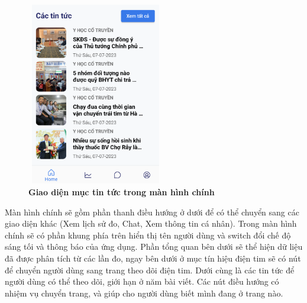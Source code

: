 \begin{figure}[H]
  \centering
  \includegraphics[width=6cm,height=8cm]{Images/mobile_app/demo/preview_news.png}
  \caption[Giao diện mục tin tức trong màn hình chính]{\bfseries \fontsize{12pt}{0pt}\selectfont Giao diện mục tin tức trong màn hình chính}
  \label{demo_preview_news} %
\end{figure}

Màn hình chính sẽ gồm phần thanh điều hướng ở dưới để có thể chuyển sang các giao diện khác (Xem lịch sử đo, Chat, Xem thông tin cá nhân).
Trong màn hình chính sẽ có phần khung phía trên hiển thị tên người dùng và switch đổi chế độ sáng tối và thông báo của ứng dụng.
Phần tổng quan bên dưới sẽ thể hiện dữ liệu đã được phân tích từ các lần đo, ngay bên dưới ở mục tín hiệu điện tim sẽ có nút để chuyển người dùng
sang trang theo dõi điện tim. Dưới cùng là các tin tức để người dùng có thể theo dõi, giới hạn ở năm bài viết. Các nút điều hướng có nhiệm vụ chuyển trang,
và giúp cho người dùng biết mình đang ở trang nào.

